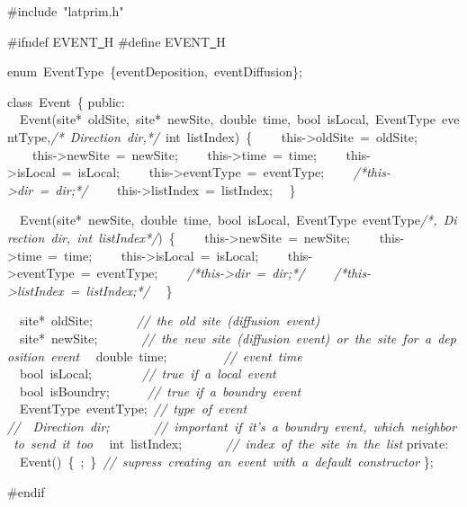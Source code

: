 {\ttfamily \raggedright \footnotesize
\#include\ "{}latprim.h"{}

\#ifndef EVENT\underline\ H
\#define EVENT\underline\ H

enum\ EventType\ \{eventDeposition,\ eventDiffusion\};

class\ Event\ \{
public:
\ \ Event(site*\ oldSite,\ site*\ newSite,\ double\ time,\ bool\ isLocal,\ EventType\ eventType,\textsl{/*\ Direction\ dir,*/}\ int\ listIndex)\ \{
\ \ \ \ this-{}>{}oldSite\ =\ oldSite;
\ \ \ \ this-{}>{}newSite\ =\ newSite;
\ \ \ \ this-{}>{}time\ =\ time;
\ \ \ \ this-{}>{}isLocal\ =\ isLocal;
\ \ \ \ this-{}>{}eventType\ =\ eventType;
\ \ \ \ \textsl{/*this-{}>{}dir\ =\ dir;*/}
\ \ \ \ this-{}>{}listIndex\ =\ listIndex;
\ \ \}

\ \ Event(site*\ newSite,\ double\ time,\ bool\ isLocal,\ EventType\ eventType\textsl{/*,\ Direction\ dir,\ int\ listIndex*/})\ \{
\ \ \ \ this-{}>{}newSite\ =\ newSite;
\ \ \ \ this-{}>{}time\ =\ time;
\ \ \ \ this-{}>{}isLocal\ =\ isLocal;
\ \ \ \ this-{}>{}eventType\ =\ eventType;
\ \ \ \ \textsl{/*this-{}>{}dir\ =\ dir;*/}
\ \ \ \ \textsl{/*this-{}>{}listIndex\ =\ listIndex;*/}
\ \ \}

\ \ site*\ oldSite;\ \ \ \ \ \ \ \textsl{//\ the\ old\ site\ (diffusion\ event)}
\ \ site*\ newSite;\ \ \ \ \ \ \ \textsl{//\ the\ new\ site\ (diffusion\ event)\ or\ the\ site\ for\ a\ deposition\ event}
\ \ double\ time;\ \ \ \ \ \ \ \ \ \textsl{//\ event\ time}
\ \ bool\ isLocal;\ \ \ \ \ \ \ \ \textsl{//\ true\ if\ a\ local\ event}
\ \ bool\ isBoundry;\ \ \ \ \ \ \textsl{//\ true\ if\ a\ boundry\ event}
\ \ EventType\ eventType;\ \textsl{//\ type\ of\ event}
\textsl{//\ \ Direction\ dir;\ \ \ \ \ \ \ //\ important\ if\ it's\ a\ boundry\ event,\ which\ neighbor\ to\ send\ it\ too}
\ \ int\ listIndex;\ \ \ \ \ \ \ \textsl{//\ index\ of\ the\ site\ in\ the\ list}
private:
\ \ Event()\ \{\ ;\ \}\ \textsl{//\ supress\ creating\ an\ event\ with\ a\ default\ constructor}
\};

\#endif
 }
\normalfont\normalsize

